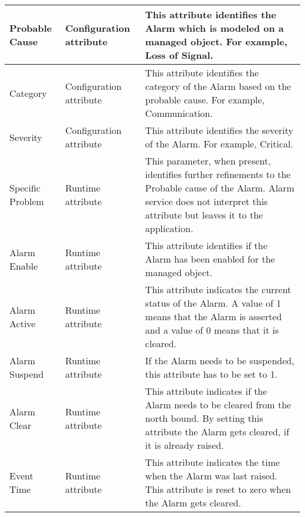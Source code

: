 \begin{flushleft}
\begin{tabular}{|l|p{2in}|p{3in}|}
Probable Cause & Configuration attribute & This attribute identifies the Alarm which is modeled on a managed object. For example, Loss of Signal.\\
\hline

Category & Configuration attribute & This attribute identifies the category of the Alarm based on the probable cause. For example, Communication. \\
\hline
Severity & Configuration attribute & This attribute identifies the severity of the Alarm. For example, Critical. \\
\hline

Specific Problem & Runtime attribute & This parameter, when present, identifies further refinements to the Probable cause of the Alarm. Alarm service
does not interpret this attribute but leaves it to the application. \\
\hline

Alarm Enable & Runtime attribute & This attribute identifies if the Alarm has been enabled for the managed object.\\
\hline
Alarm Active & Runtime attribute & This attribute indicates the current status of the Alarm. A value of 1 means that the Alarm is asserted and a value
of 0 means that it is cleared. \\
\hline
Alarm Suspend &	Runtime attribute & If the Alarm needs to be suspended, this attribute has to be set to 1.\\
\hline
Alarm Clear & Runtime attribute & This attribute indicates if the Alarm needs to be cleared from the north bound. By setting this attribute the Alarm 
gets cleared, if it is already raised.\\
\hline
Event Time & Runtime attribute & This attribute indicates the time when the Alarm was last raised. This attribute is reset to zero when the Alarm gets
cleared. \\
\hline
\end{tabular}
		

\end{flushleft}
